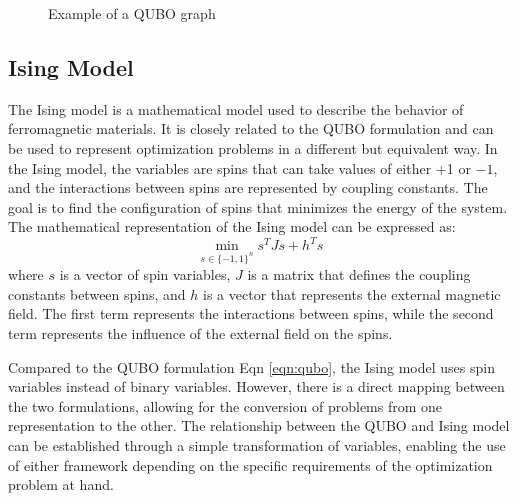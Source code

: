 \begin{figure}
    \centering
    \caption{Example of a QUBO graph}\label{fig:qubo_graph}
\end{figure}

\subsection{Ising Model}
The Ising model is a mathematical model used to describe the behavior of ferromagnetic materials. It is closely related to the QUBO formulation and can be used to represent optimization problems in a different but equivalent way. In the Ising model, the variables are spins that can take values of either +1 or $-1$, and the interactions between spins are represented by coupling constants. The goal is to find the configuration of spins that minimizes the energy of the system. 
The mathematical representation of the Ising model can be expressed as:
\begin{equation}
\min_{s \in \{-1, 1\}^n} s^T J s + h^T s
\label{eqn:ising}
\end{equation}
where $s$ is a vector of spin variables, $J$ is a matrix that defines the coupling constants between spins, and $h$ is a vector that represents the external magnetic field. The first term represents the interactions between spins, while the second term represents the influence of the external field on the spins.

Compared to the QUBO formulation Eqn \ref{eqn:qubo}, the Ising model uses spin variables instead of binary variables. However, there is a direct mapping between the two formulations, allowing for the conversion of problems from one representation to the other. The relationship between the QUBO and Ising model can be established through a simple transformation of variables, enabling the use of either framework depending on the specific requirements of the optimization problem at hand.

